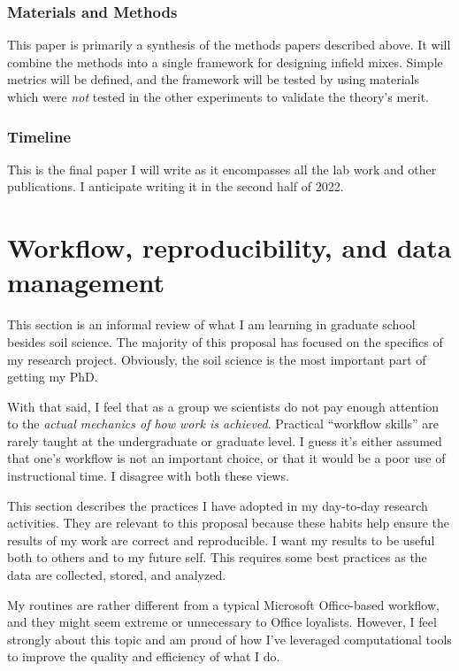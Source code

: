 \documentclass[
  letterpaper,
  openany]{book}
\begin{document}
\hypertarget{materials-and-methods-4}{%
\subsection{Materials and Methods}\label{materials-and-methods-4}}

This paper is primarily a synthesis of the methods papers described above.
It will combine the methods into a single framework for designing infield mixes.
Simple metrics will be defined, and the framework will be tested by using materials which were \emph{not} tested in the other experiments to validate the theory's merit.

\hypertarget{timeline-4}{%
\subsection{Timeline}\label{timeline-4}}

This is the final paper I will write as it encompasses all the lab work and other publications. I anticipate writing it in the second half of 2022.

\hypertarget{workflow}{%
\chapter{Workflow, reproducibility, and data management}\label{workflow}}

This section is an informal review of what I am learning in graduate school besides soil science.
The majority of this proposal has focused on the specifics of my research project.
Obviously, the soil science is the most important part of getting my PhD.

With that said, I feel that as a group we scientists do not pay enough attention to the \emph{actual mechanics of how work is achieved}.
Practical ``workflow skills'' are rarely taught at the undergraduate or graduate level.
I guess it's either assumed that one's workflow is not an important choice, or that it would be a poor use of instructional time.
I disagree with both these views.

This section describes the practices I have adopted in my day-to-day research activities.
They are relevant to this proposal because these habits help ensure the results of my work are correct and reproducible.
I want my results to be useful both to others and to my future self. This requires some best practices as the data are collected, stored, and analyzed.

My routines are rather different from a typical Microsoft Office-based workflow, and they might seem extreme or unnecessary to Office loyalists.
However, I feel strongly about this topic and am proud of how I've leveraged computational tools to improve the quality and efficiency of what I do.
\end{document}
